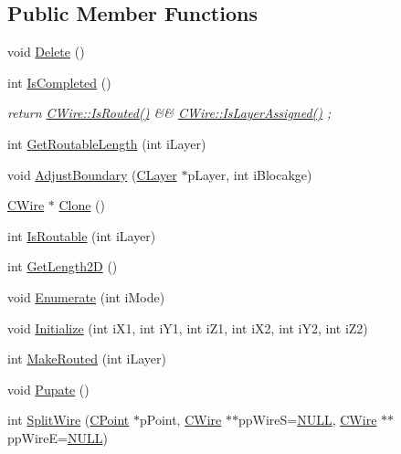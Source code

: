 \subsection*{Public Member Functions}
\begin{DoxyCompactItemize}
\item 
void \mbox{\hyperlink{classCWire_abbcbc22230d8e5a87ac4de9cbf990022}{Delete}} ()
\item 
int \mbox{\hyperlink{classCWire_a1b37fb9ea32af4a838620a368b9f3824}{Is\+Completed}} ()
\begin{DoxyCompactList}\small\item\em return \mbox{\hyperlink{classCWire_a8edc31661e3d037da712ad64cd7b8b5b}{C\+Wire\+::\+Is\+Routed()}} \&\& \mbox{\hyperlink{classCWire_a58444c1e0db9838445654d85a3405741}{C\+Wire\+::\+Is\+Layer\+Assigned()}} ; \end{DoxyCompactList}\item 
int \mbox{\hyperlink{classCWire_af22afb5379acf1aa890692416c00b8e4}{Get\+Routable\+Length}} (int i\+Layer)
\item 
void \mbox{\hyperlink{classCWire_a36dd73e309fe16428df29220bc161d0e}{Adjust\+Boundary}} (\mbox{\hyperlink{classCLayer}{C\+Layer}} $\ast$p\+Layer, int i\+Blocakge)
\item 
\mbox{\hyperlink{classCWire}{C\+Wire}} $\ast$ \mbox{\hyperlink{classCWire_a79a2ddae76fd8d2e0a96309077d5a550}{Clone}} ()
\item 
int \mbox{\hyperlink{classCWire_a3db1c3578cdf422a84a1f796460a9f9e}{Is\+Routable}} (int i\+Layer)
\item 
int \mbox{\hyperlink{classCWire_a54f754e7404cb275e2eed0e8b281817f}{Get\+Length2D}} ()
\item 
void \mbox{\hyperlink{classCWire_aa9ee88d6fd7117d3029c5a910c7957af}{Enumerate}} (int i\+Mode)
\item 
void \mbox{\hyperlink{classCWire_a32e6d904a2f532d7b6d489d8ffe4884f}{Initialize}} (int i\+X1, int i\+Y1, int i\+Z1, int i\+X2, int i\+Y2, int i\+Z2)
\item 
int \mbox{\hyperlink{classCWire_a89b640e7c8363910006273372e84effa}{Make\+Routed}} (int i\+Layer)
\item 
void \mbox{\hyperlink{classCWire_afc0e5cf89e354b121793c11ac460aa52}{Pupate}} ()
\item 
int \mbox{\hyperlink{classCWire_a16b47186198867b019f35eac02b6c52e}{Split\+Wire}} (\mbox{\hyperlink{classCPoint}{C\+Point}} $\ast$p\+Point, \mbox{\hyperlink{classCWire}{C\+Wire}} $\ast$$\ast$pp\+WireS=\mbox{\hyperlink{BoxRouter_8h_a070d2ce7b6bb7e5c05602aa8c308d0c4}{N\+U\+LL}}, \mbox{\hyperlink{classCWire}{C\+Wire}} $\ast$$\ast$pp\+WireE=\mbox{\hyperlink{BoxRouter_8h_a070d2ce7b6bb7e5c05602aa8c308d0c4}{N\+U\+LL}})

\end{DoxyCompactItemize}
